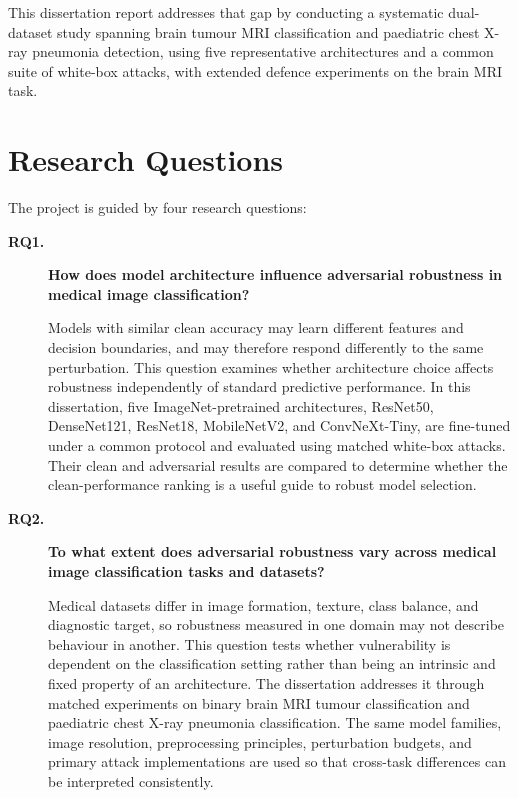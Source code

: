 \documentclass[12pt,a4paper,oneside]{report}
\begin{document}
This dissertation report addresses that gap by conducting a systematic dual-dataset study spanning brain tumour MRI classification and paediatric chest X-ray pneumonia detection, using five representative architectures and a common suite of white-box attacks, with extended defence experiments on the brain MRI task.

\section{Research Questions}
\label{sec:problem}


The project is guided by four research questions:
\begin{description}
  \item[\textbf{RQ1.}] \textbf{How does model architecture influence adversarial robustness in medical image classification?}

  Models with similar clean accuracy may learn different features and decision boundaries, and may therefore respond differently to the same perturbation. This question examines whether architecture choice affects robustness independently of standard predictive performance. In this dissertation, five ImageNet-pretrained architectures, ResNet50, DenseNet121, ResNet18, MobileNetV2, and ConvNeXt-Tiny, are fine-tuned under a common protocol and evaluated using matched white-box attacks. Their clean and adversarial results are compared to determine whether the clean-performance ranking is a useful guide to robust model selection.

  \item[\textbf{RQ2.}] \textbf{To what extent does adversarial robustness vary across medical image classification tasks and datasets?}

  Medical datasets differ in image formation, texture, class balance, and diagnostic target, so robustness measured in one domain may not describe behaviour in another. This question tests whether vulnerability is dependent on the classification setting rather than being an intrinsic and fixed property of an architecture. The dissertation addresses it through matched experiments on binary brain MRI tumour classification and paediatric chest X-ray pneumonia classification. The same model families, image resolution, preprocessing principles, perturbation budgets, and primary attack implementations are used so that cross-task differences can be interpreted consistently.


\end{description}
\end{document}
